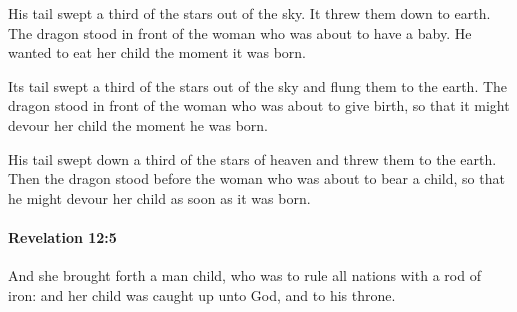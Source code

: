 \begin{framed}
\begin{compactdesc}
					\item[NIRV] His tail swept a third of the stars out of the sky. It threw them down to earth. The dragon stood in front of the woman who was about to have a baby. He wanted to eat her child the moment it was born.
					\item[NIV] Its tail swept a third of the stars out of the sky and flung them to the earth. The dragon stood in front of the woman who was about to give birth, so that it might devour her child the moment he was born.
					\item[NRSV] His tail swept down a third of the stars of heaven and threw them to the earth. Then the dragon stood before the woman who was about to bear a child, so that he might devour her child as soon as it was born.
				\end{compactdesc}
			\end{framed}

		\paragraph{Revelation 12:5} %
			\label{REVELATIONNT-12-5}

			And she brought forth a man child, who was to rule all nations with a rod of iron: and her child was caught up unto God, and to his throne.

			\begin{framed}
			\scriptsize
				\begin{compactdesc}
					\item[SBLG] 
				\end{compactdesc}
			\end{framed}

